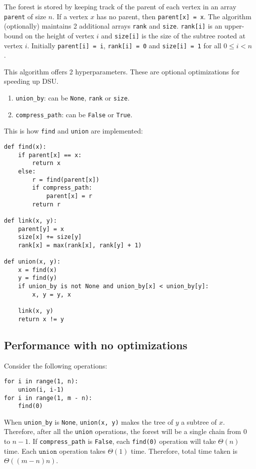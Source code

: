 The forest is stored by keeping track of the parent of each vertex
in an array \texttt{parent} of size $n$.
If a vertex $x$ has no parent, then \texttt{parent[x] = x}.
The algorithm (optionally) maintains 2 additional arrays \texttt{rank} and \texttt{size}.
\texttt{rank[i]} is an upper-bound on the height of vertex $i$
and \texttt{size[i]} is the size of the subtree rooted at vertex $i$.
Initially \texttt{parent[i] = i}, \texttt{rank[i] = 0} and \texttt{size[i] = 1} for all $0 \le i < n$.

This algorithm offers 2 hyperparameters.
These are optional optimizations for speeding up DSU.
\begin{enumerate}
\item \texttt{union\_by}: can be \texttt{None}, \texttt{rank} or \texttt{size}.
\item \texttt{compress\_path}: can be \texttt{False} or \texttt{True}.
\end{enumerate}

This is how \texttt{find} and \texttt{union} are implemented:
\begin{lstlisting}
def find(x):
    if parent[x] == x:
        return x
    else:
        r = find(parent[x])
        if compress_path:
            parent[x] = r
        return r

def link(x, y):
    parent[y] = x
    size[x] += size[y]
    rank[x] = max(rank[x], rank[y] + 1)

def union(x, y):
    x = find(x)
    y = find(y)
    if union_by is not None and union_by[x] < union_by[y]:
        x, y = y, x

    link(x, y)
    return x != y
\end{lstlisting}

\subsection{Performance with no optimizations}

Consider the following operations:
\begin{lstlisting}
for i in range(1, n):
    union(i, i-1)
for i in range(1, m - n):
    find(0)
\end{lstlisting}

When \texttt{union\_by} is \texttt{None}, \texttt{union(x, y)}
makes the tree of $y$ a subtree of $x$.
Therefore, after all the \texttt{union} operations, the forest will be a single chain from 0 to $n-1$.
If \texttt{compress\_path} is \texttt{False}, each \texttt{find(0)} operation will take $\Theta(n)$ time.
Each $\texttt{union}$ operation takes $\Theta(1)$ time.
Therefore, total time taken is $\Theta((m-n)n)$.

